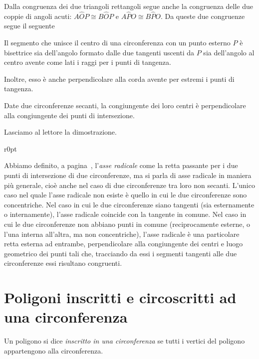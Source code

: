 Dalla congruenza dei due triangoli rettangoli segue anche la congruenza delle due coppie di angoli acuti: $A\widehat{O}P\cong B\widehat{O}P$ e $A\widehat{P}O\cong B\widehat{P}O$. Da queste due congruenze segue il seguente 
\begin{corollario}\label{cor:5.1}
Il segmento che unisce il centro di una circonferenza con un punto esterno $P$ è bisettrice sia dell'angolo formato dalle due tangenti uscenti da $P$ sia dell'angolo al centro avente come lati i raggi per i punti di tangenza.
\end{corollario}
Inoltre, esso è anche perpendicolare alla corda avente per estremi i punti di tangenza.

\begin{corollario}
Date due circonferenze secanti, la congiungente dei loro centri è perpendicolare alla congiungente dei punti di intersezione.
\end{corollario}

Lasciamo al lettore la dimostrazione.

\begin{wrapfigure}{r}{0pt}
	\centering
\end{wrapfigure}
Abbiamo definito, a pagina~\pageref{def:asse_radicale}, l'\emph{asse radicale} come la retta passante per i due punti di intersezione di due circonferenze, ma si parla di asse radicale in maniera più generale, cioè anche nel caso di due circonferenze tra loro non secanti. L'unico caso nel quale l'asse radicale non esiste è quello in cui le due circonferenze sono concentriche.
Nel caso in cui le due circonferenze siano tangenti (sia esternamente o internamente), l'asse radicale coincide con la tangente in comune.
Nel caso in cui le due circonferenze non abbiano punti in comune (reciprocamente esterne, o l'una interna all'altra, ma non concentriche), l'asse radicale è una particolare retta esterna ad entrambe, perpendicolare alla congiungente dei centri e luogo geometrico dei punti tali che, tracciando da essi i segmenti tangenti alle due circonferenze essi risultano congruenti.


\section{Poligoni inscritti e circoscritti ad una circonferenza}

\begin{definizione}
Un poligono si dice \emph{inscritto in una circonferenza} se tutti i vertici del poligono appartengono alla circonferenza.
\end{definizione}

